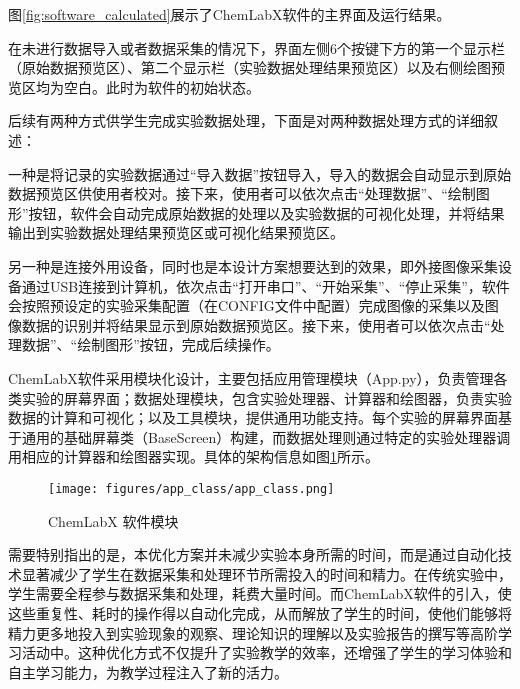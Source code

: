 图\ref{fig:software_calculated}展示了ChemLabX软件的主界面及运行结果。

在未进行数据导入或者数据采集的情况下，界面左侧6个按键下方的第一个显示栏（原始数据预览区）、第二个显示栏（实验数据处理结果预览区）以及右侧绘图预览区均为空白。此时为软件的初始状态。

后续有两种方式供学生完成实验数据处理，下面是对两种数据处理方式的详细叙述：

一种是将记录的实验数据通过“导入数据”按钮导入，导入的数据会自动显示到原始数据预览区供使用者校对。接下来，使用者可以依次点击“处理数据”、“绘制图形”按钮，软件会自动完成原始数据的处理以及实验数据的可视化处理，并将结果输出到实验数据处理结果预览区或可视化结果预览区。

另一种是连接外用设备，同时也是本设计方案想要达到的效果，即外接图像采集设备通过USB连接到计算机，依次点击“打开串口”、“开始采集”、“停止采集”，软件会按照预设定的实验采集配置（在CONFIG文件中配置）完成图像的采集以及图像数据的识别并将结果显示到原始数据预览区。接下来，使用者可以依次点击“处理数据”、“绘制图形”按钮，完成后续操作。

ChemLabX软件采用模块化设计，主要包括应用管理模块（App.py），负责管理各类实验的屏幕界面；数据处理模块，包含实验处理器、计算器和绘图器，负责实验数据的计算和可视化；以及工具模块，提供通用功能支持。每个实验的屏幕界面基于通用的基础屏幕类（BaseScreen）构建，而数据处理则通过特定的实验处理器调用相应的计算器和绘图器实现。具体的架构信息如图\ref{fig:software_class}所示。

\begin{figure}[H]
\centering
\texttt{[image: figures/app\_class/app\_class.png]}
\caption{ChemLabX 软件模块}
\label{fig:software_class}
\end{figure}

需要特别指出的是，本优化方案并未减少实验本身所需的时间，而是通过自动化技术显著减少了学生在数据采集和处理环节所需投入的时间和精力。在传统实验中，学生需要全程参与数据采集和处理，耗费大量时间。而ChemLabX软件的引入，使这些重复性、耗时的操作得以自动化完成，从而解放了学生的时间，使他们能够将精力更多地投入到实验现象的观察、理论知识的理解以及实验报告的撰写等高阶学习活动中。这种优化方式不仅提升了实验教学的效率，还增强了学生的学习体验和自主学习能力，为教学过程注入了新的活力。